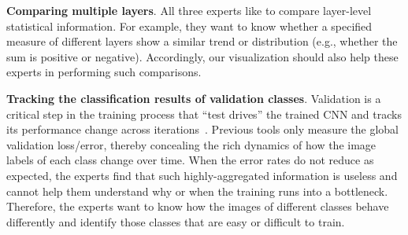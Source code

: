 \documentclass[format=acmsmall, review=false, screen=true]{acmart}
\begin{document}
		
	\item \textbf{Comparing multiple layers}.
	All three experts like to compare layer-level statistical information. 
	For example, they want to know whether a specified measure of different layers show a similar trend or distribution (e.g., whether the sum is positive or negative).
	Accordingly, our visualization should also help these experts in performing such comparisons. 
		
	\item \textbf{Tracking the classification results of validation classes}.
	Validation is a critical step in the training process that ``test drives'' the trained CNN and tracks its performance change across iterations~\cite{bengio2012practical}.
	Previous tools only measure the global validation loss/error, thereby concealing the rich dynamics of how the image labels of each class change over time.
	When the error rates do not reduce as expected, the experts find that such highly-aggregated information is useless and cannot help them understand why or when the training runs into a bottleneck.
	Therefore, the experts want to know how the images of different classes behave differently and identify those classes that are easy or difficult to train.
\end{document}
